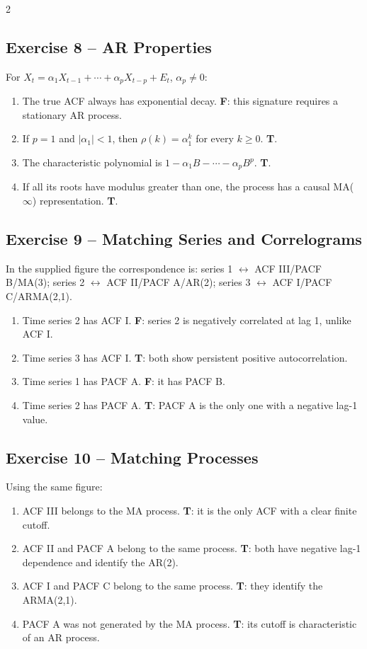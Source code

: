 \documentclass[9pt,a4paper]{extarticle}
\begin{document}
\begin{multicols}{2}
\subsection*{Exercise 8 -- AR Properties}
For \(X_t=\alpha_1X_{t-1}+\cdots+\alpha_pX_{t-p}+E_t\), \(\alpha_p\neq0\):
\begin{enumerate}[label=\alph*),leftmargin=4mm]
\item The true ACF always has exponential decay. \textbf{F}: this signature requires a stationary AR process.
\item If \(p=1\) and \(|\alpha_1|<1\), then \(\rho(k)=\alpha_1^k\) for every \(k\ge0\). \textbf{T}.
\item The characteristic polynomial is \(1-\alpha_1B-\cdots-\alpha_pB^p\). \textbf{T}.
\item If all its roots have modulus greater than one, the process has a causal MA(\(\infty\)) representation. \textbf{T}.
\end{enumerate}

\subsection*{Exercise 9 -- Matching Series and Correlograms}
In the supplied figure the correspondence is: series 1 \(\leftrightarrow\) ACF III/PACF B/MA(3); series 2 \(\leftrightarrow\) ACF II/PACF A/AR(2); series 3 \(\leftrightarrow\) ACF I/PACF C/ARMA(2,1).
\begin{enumerate}[label=\alph*),leftmargin=4mm]
\item Time series 2 has ACF I. \textbf{F}: series 2 is negatively correlated at lag 1, unlike ACF I.
\item Time series 3 has ACF I. \textbf{T}: both show persistent positive autocorrelation.
\item Time series 1 has PACF A. \textbf{F}: it has PACF B.
\item Time series 2 has PACF A. \textbf{T}: PACF A is the only one with a negative lag-1 value.
\end{enumerate}

\subsection*{Exercise 10 -- Matching Processes}
Using the same figure:
\begin{enumerate}[label=\alph*),leftmargin=4mm]
\item ACF III belongs to the MA process. \textbf{T}: it is the only ACF with a clear finite cutoff.
\item ACF II and PACF A belong to the same process. \textbf{T}: both have negative lag-1 dependence and identify the AR(2).
\item ACF I and PACF C belong to the same process. \textbf{T}: they identify the ARMA(2,1).
\item PACF A was not generated by the MA process. \textbf{T}: its cutoff is characteristic of an AR process.
\end{enumerate}


\end{multicols}
\end{document}
